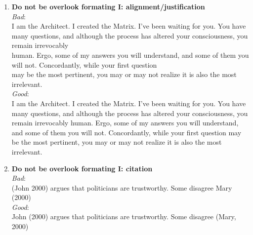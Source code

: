 \documentclass[a4paper]{article}
\begin{document}
\begin{enumerate}
\item \textbf{Do not be overlook formating I: alignment/justification}\\
\textit{Bad}:\\
 I am the Architect. I created the Matrix. I've been waiting for you. You have many questions, and although the process has altered your consciousness, you remain irrevocably \\
 human. Ergo, some of my answers you will understand, and some of them you will not. Concordantly, while your first question \\
 may be the most pertinent, you may or may not realize it is also the most irrelevant.\\
\textit{Good}:\\
I am the Architect. I created the Matrix. I've been waiting for you. You have many questions, and although the process has altered your consciousness, you remain irrevocably human. Ergo, some of my answers you will understand, and some of them you will not. Concordantly, while your first question may be the most pertinent, you may or may not realize it is also the most irrelevant.
\item \textbf{Do not be overlook formating I: citation}\\
\textit{Bad}:\\
(John 2000) argues that politicians are trustworthy. Some disagree Mary (2000)\\
\textit{Good}:\\
John (2000) argues that politicians are trustworthy. Some disagree (Mary, 2000)
\end{enumerate}
\end{document}
